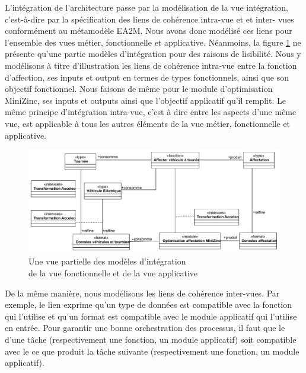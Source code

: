 L'intégration de l'architecture passe par la modélisation de la vue intégration,
c'est-à-dire par la spécification des liens de cohérence  intra-vue et et inter-
vues conformément au métamodèle EA2M. Nous avons donc modélisé ces liens pour
l'ensemble des vues métier, fonctionnelle et applicative. Néanmoins, la figure
\ref{fig:integration_gestion_flotte} ne présente qu'une partie modèles
d'intégration pour des raisons de lisibilité. Nous y modélisons à titre
d'illustration les liens de cohérence intra-vue entre la fonction d'affection,
ses inputs et output en termes de types fonctionnels, ainsi que son objectif
fonctionnel. Nous faisons de même pour le module d'optimisation MiniZinc, ses
inputs et outputs ainsi que l'objectif applicatif qu'il remplit. Le même
principe d'intégration intra-vue, c'est à dire entre les aspects d'une même vue,
est applicable à tous les autres éléments de la vue métier, fonctionnelle et
applicative.

\begin{figure}[!htbp]
 \begin{center}
  \includegraphics[trim= 0cm 0cm 0cm 0cm, width=1\textwidth]{figures/5_implementation/integration_affectation.pdf}
 \end{center}
 \caption{Une vue partielle des modèles d'intégration \\de la vue fonctionnelle et de la vue applicative}
 \label{fig:integration_gestion_flotte}
\end{figure}

De la même manière, nous modélisons les liens de cohérence inter-vues. Par
exemple, le lien  exprime qu'un type de données est compatible avec
la fonction qui l'utilise et qu'un format est compatible avec le module
applicatif qui l'utilise en entrée. Pour garantir une bonne orchestration des
processus, il faut que le  d'une tâche (respectivement une fonction,
un module applicatif) soit compatible avec le ce que produit la tâche suivante
(respectivement une fonction, un module applicatif).

